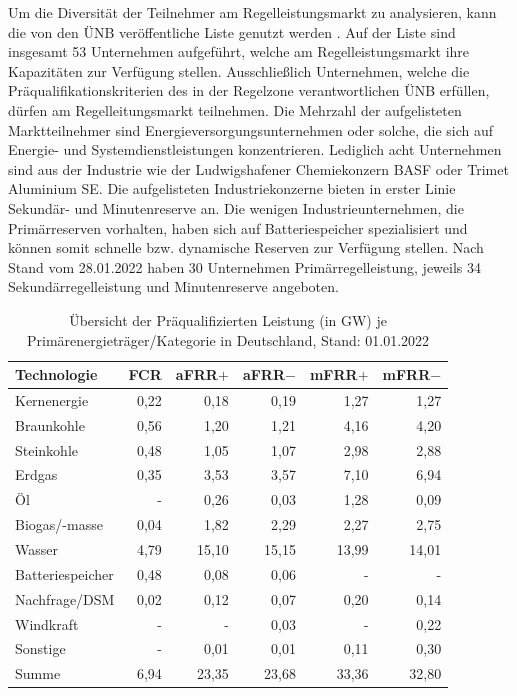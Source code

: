 			Um die Diversität der Teilnehmer am Regelleistungsmarkt zu analysieren, kann die von den ÜNB veröffentliche Liste genutzt werden \cite{regelleistungnet_PRL_Ausschreibung}.
			Auf der Liste sind insgesamt \num{53} Unternehmen aufgeführt, welche am Regelleistungsmarkt ihre Kapazitäten zur Verfügung stellen.
			Ausschließlich Unternehmen, welche die Präqualifikationskriterien des in der Regelzone verantwortlichen ÜNB erfüllen, dürfen am Regelleitungsmarkt teilnehmen.
			Die Mehrzahl der aufgelisteten Marktteilnehmer sind Energieversorgungsunternehmen oder solche, die sich auf Energie- und Systemdienstleistungen konzentrieren.
			Lediglich acht Unternehmen sind aus der Industrie wie der Ludwigshafener Chemiekonzern BASF oder Trimet Aluminium SE.
			Die aufgelisteten Industriekonzerne bieten in erster Linie Sekundär- und Minutenreserve an.
			Die wenigen Industrieunternehmen, die Primärreserven vorhalten, haben sich auf Batteriespeicher spezialisiert und können somit schnelle bzw. dynamische Reserven zur Verfügung stellen.
			Nach Stand vom 28.01.2022 haben 30 Unternehmen Primärregelleistung, jeweils 34 Sekundärregelleistung und Minutenreserve angeboten. 
						
			\begin{table}[H]
				\renewcommand*{\arraystretch}{1.3} %
				\centering
				\caption{Übersicht der Präqualifizierten Leistung (in \si{\giga\watt}) je Primärenergieträger/Kategorie in Deutschland, Stand: 01.01.2022 \cite{regelleistungnet_PRL_Ausschreibung}}
				\label{Tab. Übersicht der Präqualifizierten Leistung je PrimärenergieträgerKategorie in Deutschland}
				\begin{tabular}{lrrrrr}
					\hline
					Technologie & FCR  & aFRR$+$ & aFRR$-$& mFRR$+$ & mFRR$-$ \\ \hline
					Kernenergie & 0,22 & 0,18 & 0,19 & 1,27 & 1,27 \\
					Braunkohle & 0,56 & 1,20 & 1,21 & 4,16 & 4,20 \\
					Steinkohle & 0,48 & 1,05 & 1,07 & 2,98 & 2,88 \\
					Erdgas & 0,35 & 3,53 & 3,57 & 7,10 & 6,94 \\
					Öl & - & 0,26 & 0,03 & 1,28 & 0,09 \\
					Biogas/-masse & 0,04 & 1,82 & 2,29 & 2,27 & 2,75 \\
					Wasser & 4,79 & 15,10 & 15,15 & 13,99 & 14,01 \\
					Batteriespeicher & 0,48 & 0,08 & 0,06 & - & - \\
					Nachfrage/DSM & 0,02 & 0,12 & 0,07 & 0,20 & 0,14 \\
					Windkraft & - & - & 0,03 & - & 0,22 \\
					Sonstige & - & 0,01 & 0,01 & 0,11 & 0,30 \\ \hline
					Summe & 6,94 & 23,35 & 23,68 & 33,36 & 32,80
				\end{tabular}
				\renewcommand*{\arraystretch}{1.3} %
			\end{table}
			\renewcommand*{\arraystretch}{1.3} %
			
